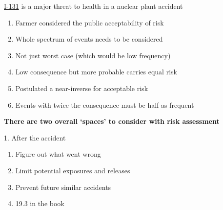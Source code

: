 \documentclass[aspectratio=1610,pdftex,dvipsnames,compress,xcolor={dvipsnames}]{beamer}
\begin{document}
\begin{frame}{\href{https://radioactivity.eu.com/phenomenon/iodine_131}{I-131} is a major threat to health in a nuclear plant accident}
    \begin{enumerate}[series=outerlist,topsep=0pt,itemsep=15pt,leftmargin=*,label=(\arabic*)]
        \item[]Farmer considered the public acceptability of risk  
        \item[]Whole spectrum of events needs to be considered  
        \item[]Not just worst case (which would be low frequency)
        \item[]Low consequence but more probable carries equal risk
        \item[]Postulated a near-inverse for acceptable risk  
        \item[]Events with twice the consequence must be half as frequent
    \end{enumerate}
\end{frame}


\begin{frame}[plain]{}
    \centering\textbf{There are two overall `spaces' to consider with risk assessment}
\end{frame}


\addtocounter{framenumber}{-1}
\begin{frame}{1. After the accident}
    \begin{enumerate}[series=outerlist,topsep=0pt,itemsep=21pt,leftmargin=*,label=(\arabic*)]
        \item[]Figure out what went wrong
        \item[]Limit potential exposures and releases
        \item[]Prevent future similar accidents
        \item[]19.3 in the book
    \end{enumerate}
\end{frame}
\end{document}
